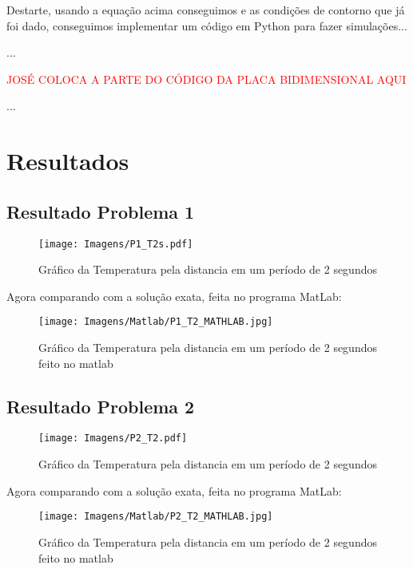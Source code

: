 \documentclass[final,5p,times,twocolumn]{elsarticle}
\begin{document}
Destarte, usando a equação acima conseguimos e as condições de contorno que já foi dado, conseguimos implementar um código em Python para fazer simulações...

...

\textcolor{red}{JOSÉ COLOCA A PARTE DO CÓDIGO DA PLACA BIDIMENSIONAL AQUI}

...




\section{Resultados}

\subsection{Resultado Problema 1}
\label{sec:ResultadoP1}

\begin{figure}[h]
    \centering
    \texttt{[image: Imagens/P1\_T2s.pdf]}
    \caption{Gráfico da Temperatura pela distancia em um período de 2 segundos}
    \label{fig:mesh1}
\end{figure}

Agora comparando com a solução exata, feita no programa MatLab:

\begin{figure}[h]
    \centering
    \texttt{[image: Imagens/Matlab/P1\_T2\_MATHLAB.jpg]}
    \caption{Gráfico da Temperatura pela distancia em um período de 2 segundos feito no matlab}
    \label{fig:mesh1}
\end{figure}

\subsection{Resultado Problema 2}
\label{sec:ResultadoP2}

\begin{figure}[h]
    \centering
    \texttt{[image: Imagens/P2\_T2.pdf]}
    \caption{Gráfico da Temperatura pela distancia em um período de 2 segundos}
    \label{fig:mesh1}
\end{figure}

Agora comparando com a solução exata, feita no programa MatLab:

\begin{figure}[h]
    \centering
    \texttt{[image: Imagens/Matlab/P2\_T2\_MATHLAB.jpg]}
    \caption{Gráfico da Temperatura pela distancia em um período de 2 segundos feito no matlab}
    \label{fig:mesh1}
\end{figure}
\end{document}
